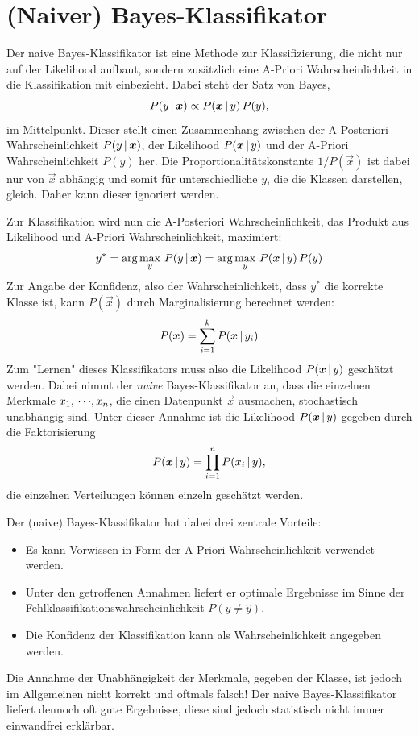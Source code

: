 	\section{(Naiver) Bayes-Klassifikator}
		Der naive Bayes-Klassifikator ist eine Methode zur Klassifizierung, die nicht nur auf der Likelihood aufbaut, sondern zusätzlich eine A-Priori Wahrscheinlichkeit in die Klassifikation mit einbezieht. Dabei steht der Satz von Bayes,
		\begin{equation}
			P(y \,\vert\, \bm{x}) \propto P(\bm{x} \,\vert\, y) \, P(y),
		\end{equation}
		im Mittelpunkt. Dieser stellt einen Zusammenhang zwischen der A-Posteriori Wahrscheinlichkeit \( P(y \,\vert\, \bm{x}) \), der Likelihood \( P(\bm{x} \,\vert\, y) \) und der A-Priori Wahrscheinlichkeit \( P(y) \) her. Die Proportionalitätskonstante \( 1 / P(\vec{x}) \) ist dabei nur von \(\vec{x}\) abhängig und somit für unterschiedliche \(y\), die die Klassen darstellen, gleich. Daher kann dieser \iA ignoriert werden.

		Zur Klassifikation wird nun die A-Posteriori Wahrscheinlichkeit, \bzw das Produkt aus Likelihood und A-Priori Wahrscheinlichkeit, maximiert:
		\begin{equation}
			y^\ast = \arg\max_y \, P(y \,\vert\, \bm{x}) = \arg\max_y \, P(\bm{x} \,\vert\, y) \, P(y)
		\end{equation}
		Zur Angabe der Konfidenz, also der Wahrscheinlichkeit, dass \(y^\ast\) die korrekte Klasse ist, kann \(P(\vec{x})\) durch Marginalisierung berechnet werden:
		\begin{equation}
			P(\bm{x}) = \sum_{i = 1}^{k} P(\bm{x} \,\vert\, y_i)
		\end{equation}
		Zum "Lernen" dieses Klassifikators muss also die Likelihood \( P(\bm{x} \,\vert\, y) \) geschätzt werden. Dabei nimmt der \emph{naive} Bayes-Klassifikator an, dass die einzelnen Merkmale \( x_1,\,\cdots\!,x_n \), die einen Datenpunkt \(\vec{x}\) ausmachen, stochastisch unabhängig sind. Unter dieser Annahme ist die Likelihood \( P(\bm{x} \,\vert\, y) \) gegeben durch die Faktorisierung
		\begin{equation}
			P(\bm{x} \,\vert\, y) = \prod_{i = 1}^{n} P(x_i \,\vert\, y),
		\end{equation}
		\dh die einzelnen Verteilungen können einzeln geschätzt werden.

		Der (naive) Bayes-Klassifikator hat dabei drei zentrale Vorteile:
		\begin{itemize}
			\item Es kann Vorwissen in Form der A-Priori Wahrscheinlichkeit verwendet werden.
			\item Unter den getroffenen Annahmen liefert er optimale Ergebnisse im Sinne der Fehlklassifikationswahrscheinlichkeit \( P(y \neq \hat{y}) \).
			\item Die Konfidenz der Klassifikation kann als Wahrscheinlichkeit angegeben werden.
		\end{itemize}
		Die Annahme der Unabhängigkeit der Merkmale, gegeben der Klasse, ist jedoch im Allgemeinen nicht korrekt und oftmals falsch! Der naive Bayes-Klassifikator liefert dennoch oft gute Ergebnisse, diese sind jedoch statistisch nicht immer einwandfrei erklärbar.

